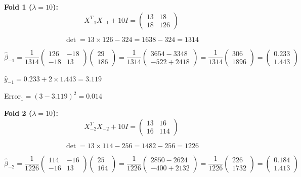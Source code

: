 \documentclass[12pt]{article}
\begin{document}
\begin{solution}
\textbf{Fold 1 ($\lambda = 10$):}
\[X_{-1}^TX_{-1} + 10I = \begin{pmatrix} 13 & 18 \\ 18 & 126 \end{pmatrix}\]

\[\det = 13 \times 126 - 324 = 1638 - 324 = 1314\]

\[\hat{\beta}_{-1} = \frac{1}{1314}\begin{pmatrix} 126 & -18 \\ -18 & 13 \end{pmatrix}\begin{pmatrix} 29 \\ 186 \end{pmatrix} = \frac{1}{1314}\begin{pmatrix} 3654 - 3348 \\ -522 + 2418 \end{pmatrix} = \frac{1}{1314}\begin{pmatrix} 306 \\ 1896 \end{pmatrix} = \begin{pmatrix} 0.233 \\ 1.443 \end{pmatrix}\]

$\hat{y}_{-1} = 0.233 + 2 \times 1.443 = 3.119$

Error$_1 = (3 - 3.119)^2 = 0.014$

\textbf{Fold 2 ($\lambda = 10$):}
\[X_{-2}^TX_{-2} + 10I = \begin{pmatrix} 13 & 16 \\ 16 & 114 \end{pmatrix}\]

\[\det = 13 \times 114 - 256 = 1482 - 256 = 1226\]

\[\hat{\beta}_{-2} = \frac{1}{1226}\begin{pmatrix} 114 & -16 \\ -16 & 13 \end{pmatrix}\begin{pmatrix} 25 \\ 164 \end{pmatrix} = \frac{1}{1226}\begin{pmatrix} 2850 - 2624 \\ -400 + 2132 \end{pmatrix} = \frac{1}{1226}\begin{pmatrix} 226 \\ 1732 \end{pmatrix} = \begin{pmatrix} 0.184 \\ 1.413 \end{pmatrix}\]


\end{solution}
\end{document}
